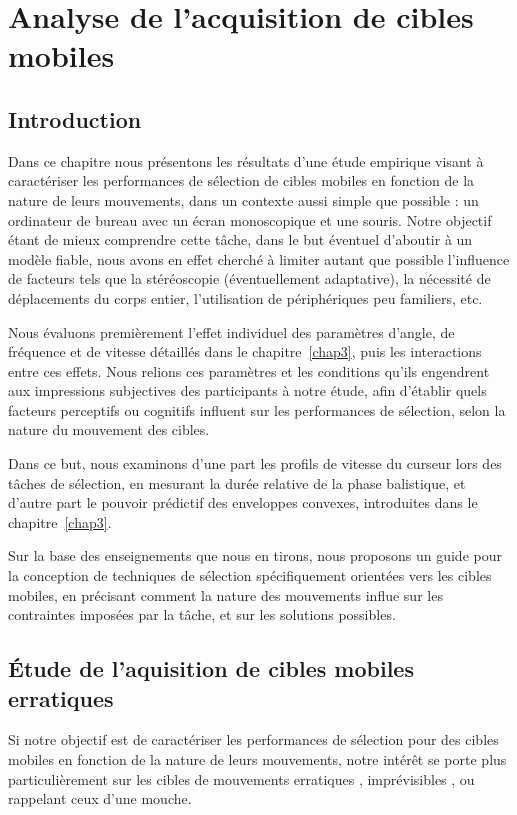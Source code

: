 
\chapter[Analyse de l'acquisition de cibles mobiles]{Analyse de l'acquisition de cibles mobiles}
\minitoc
\label{chap4}
\cleardoublepage

\section{Introduction}
	Dans ce chapitre nous présentons les résultats d'une étude empirique visant à caractériser les performances de sélection de cibles mobiles en fonction de la nature de leurs mouvements, dans un contexte aussi simple que possible : un ordinateur de bureau avec un écran monoscopique et une souris. Notre objectif étant de mieux comprendre cette tâche, dans le but éventuel d'aboutir à un modèle fiable, nous avons en effet cherché à limiter autant que possible l'influence de facteurs tels que la stéréoscopie (éventuellement adaptative), la nécessité de déplacements du corps entier, l'utilisation de périphériques peu familiers, etc. 
	
	Nous évaluons premièrement l'effet individuel des paramètres d'angle, de fréquence et de vitesse détaillés dans le chapitre~\ref{chap3}, puis les interactions entre ces effets. Nous relions ces paramètres et les conditions qu'ils engendrent aux impressions subjectives des participants à notre étude, afin d'établir quels facteurs perceptifs ou cognitifs influent sur les performances de sélection, selon la nature du mouvement des cibles.

	Dans ce but, nous examinons d'une part les profils de vitesse du curseur lors des tâches de sélection, en mesurant la durée relative de la phase balistique, et d'autre part le pouvoir prédictif des enveloppes convexes, introduites dans le chapitre~\ref{chap3}.
	
	Sur la base des enseignements que nous en tirons, nous proposons un guide pour la conception de techniques de sélection spécifiquement orientées vers les cibles mobiles, en précisant comment la nature des mouvements influe sur les contraintes imposées par la tâche, et sur les solutions possibles.

\section{Étude de l'aquisition de cibles mobiles erratiques}
	Si notre objectif est de caractériser les performances de sélection pour des cibles mobiles en fonction de la nature de leurs mouvements, notre intérêt se porte plus particulièrement sur les cibles de mouvements \og erratiques \fg{}, \og imprévisibles \fg{}, ou rappelant ceux d'une mouche.
	
